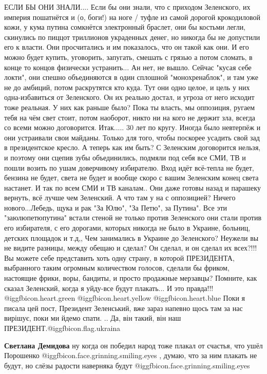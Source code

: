 \begin{itemize}
\obeycr
ЕСЛИ БЫ ОНИ ЗНАЛИ....
Если бы они знали, что с приходом Зеленского, их империя пошатнётся и (о, боги!) на ноге / туфле из самой дорогой крокодиловой кожи, у кума путина сомкнётся электронный браслет, они бы костьми легли, скинулись по пиццот триллионов украденных денег, но никогда бы не допустили его к власти.
Они просчитались и им показалось, что он такой как они. И его можно будет купить, уговорить, запугать, смешать с грязью а потом сломать, в конце то концов физически устранить...
Ан нет, не вышло.
Сейчас "кусая себе локти", они спешно объединяются в один сплошной "монохренаблок", и там уже не до амбиций, потом раскрутятся кто куда. Тут они одно целое, и цель у них одна-избавиться от Зеленского. Он их реально достал, и угроза от него исходит тоже реальная.
У них как раньше было? Пока ты власть, мы оппозиция, ругаем тебя на чём свет стоит, потом наоборот, никто ни на кого не держит зла, всегда со всеми можно договорится.
Итак..... 30 лет по кругу.
Иногда было невтерпёж и они устраивали свои майданы. Только для того, чтобы поскорее усадить свой зад в президентское кресло.
А теперь как им быть? С Зеленским договорится нельзя, и поэтому они сцепив зубы объединились, подмяли под себя все СМИ, ТВ и пошли возить по ушам доверчивому избирателю.
Вход идёт всё-тепла не будет, бензина не будет, света не будет и вообще скоро с вашим Зеленским конец света настанет. И так по всем СМИ и ТВ каналам..
Они даже готовы назад и парашеку вернуть, всё лучше чем Зеленский.
А что там у на с оппозицией? Ничего нового...Лебедь, щука и рак
"За Юлю", "За Петю", за Путина".
Все эти "заюлюпетюпутина" встали стеной не только против Зеленского они стали против его избирателя, с его дорогами, которых никогда не было в Украине, больниц, детских площадок и т.д,,
Чем занимались в Украине до Зеленского?
Неужели вы не видите разницы, между обещаю и сделал?
Он сделал, и он сделал их всех?!!!
Вы можете себе представить хоть одну страну, в которой ПРЕЗИДЕНТА, выбранного таким огромным количеством голосов, сделали бы фриком, настоящие фрики, воры, бандиты, и просто продажные мерзавцы?
Помните, как сказал Зеленский, когда я уйду-все будут плакать...
И это правда!!!
 @igg{fbicon.heart.green}  @igg{fbicon.heart.yellow}  @igg{fbicon.heart.blue} 
Поки я писала цей пост, Президент Зеленський, вже зараз напевно щось там за нас вирішує, поки ми йдемо спати. ..
Да, він такий, він наш ПРЕЗИДЕНТ.@igg{fbicon.flag.ukraina}
\restorecr

\begin{itemize} %
\textbf{Светлана Демидова} ну когда он победил народ тоже плакал от счастья, что ушёл Порошенко @igg{fbicon.face.grinning.smiling.eyes} , думаю, что за ним плакать не будут, но слёзы радости наверняка будут @igg{fbicon.face.grinning.smiling.eyes} 


\end{itemize}
\end{itemize}
